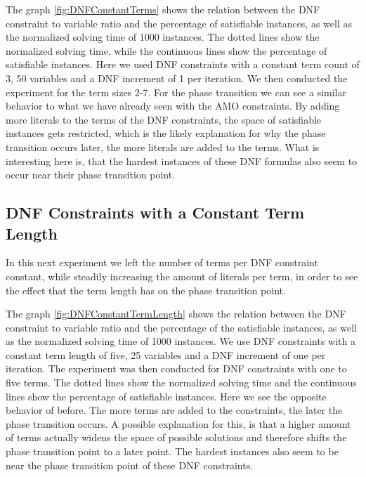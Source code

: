 


The graph \ref{fig:DNFConstantTerms} shows the relation between the DNF constraint to variable ratio and the percentage of satisfiable instances, as well as the normalized solving time of 1000 instances. The dotted lines show the normalized solving time, while the continuous lines show the percentage of satisfiable instances. Here we used DNF constraints with a constant term count of 3, 50 variables and a DNF increment of 1 per iteration. We then conducted the experiment for the term sizes 2-7. For the phase transition we can see a similar behavior to what we have already seen with the AMO constraints. By adding more literals to the terms of the DNF constraints, the space of satisfiable instances gets restricted, which is the likely explanation for why the phase transition occurs later, the more literals are added to the terms. What is interesting here is, that the hardest instances of these DNF formulas also seem to occur near their phase transition point.

\subsection{DNF Constraints with a Constant Term Length}

In this next experiment we left the number of terms per DNF constraint constant, while steadily increasing the amount of literals per term, in order to see the effect that the term length has on the phase transition point.

	

The graph \ref{fig:DNFConstantTermLength} shows the relation between the DNF constraint to variable ratio and the percentage of the satisfiable instances, as well as the normalized solving time of 1000 instances. We use DNF constraints with a constant term length of five, 25 variables and a DNF increment of one per iteration. The experiment was then conducted for DNF constraints with one to five terms. The dotted lines show the normalized solving time and the continuous lines show the percentage of satisfiable instances. Here we see the opposite behavior of before. The more terms are added to the constraints, the later the phase transition occurs. A possible explanation for this, is that a higher amount of terms actually widens the space of possible solutions and therefore shifts the phase transition point to a later point. The hardest instances also seem to be near the phase transition point of these DNF constraints.

